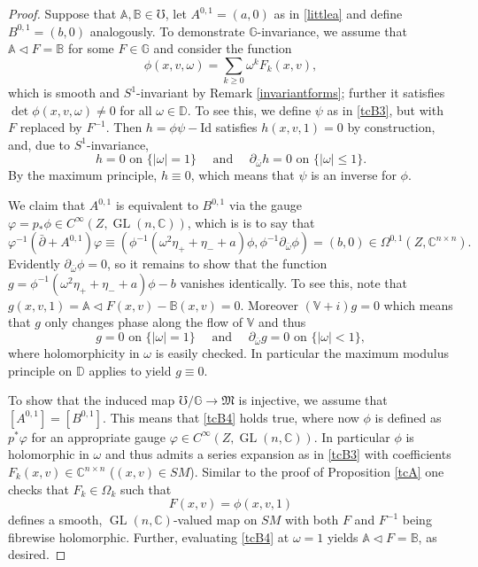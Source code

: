 \documentclass[JEP,XML,SOM,Unicode,published]{cedram}
\DeclareMathOperator{\GL}{GL}
\theoremstyle{plain}
\theoremstyle{definition}
\newcommand{\A}{\mathbb{A}}
\newcommand{\B}{\mathbb{B}}
\newcommand{\G}{\mathbb{G}}
\newcommand{\C}{\mathbb{C}}
\newcommand{\DD}{\mathbb{D}}
\newcommand{\V}{\mathbb{V}}
\newcommand{\M}{\mathfrak{M}}
\newcommand{\Id}{\mathrm{Id}}
\newcommand{\1}{{\bf 1}}
\let\act\triangleleft
\begin{document}
\begin{proof} Suppose that $\A,\B\in \mho$, let $A^{0,1}=(a,0)$ as in \eqref{littlea} and define $B^{0,1}=(b,0)$ analogously. To demonstrate $\G$-invariance, we assume that $\A \act F=\B$ for some $F\in \G$ and consider the function
\begin{equation} \label{tcB3}
\phi(x,v,\omega) = \sum_{k\ge 0} \omega^k F_k(x,v),
\end{equation}
which is smooth and $S^1$-invariant by Remark \ref{invariantforms}; further it satisfies $\det \phi(x,v,\omega) \neq 0$ for all $\omega\in \DD$. To see this, we define $\psi$ as in \eqref{tcB3}, but with $F$ replaced by $F^{-1}$. Then $h=\phi \psi - \Id$ satisfies $h(x,v,1)=0$ by construction, and, due to $S^1$-invariance,
\begin{equation*}
h = 0 \text{ on } \{\vert \omega \vert = 1\} \quad \text{ and } \quad \partial_{\bar \omega} h = 0 \text { on } \{\vert \omega \vert\le 1\}.
\end{equation*}
By the maximum principle, $h\equiv 0$, which means that $\psi$ is an inverse for $\phi$.

We claim that $A^{0,1}$ is equivalent to $B^{0,1}$ via the gauge $\varphi=p_*\phi \in C^\infty(Z,\GL(n,\C))$, which is is to say that
\begin{equation}\label{tcB4}
\varphi^{-1} (\bar \partial + A^{0,1})\varphi \equiv \left(\phi^{-1}(\omega^2 \eta_+ + \eta_- + a)\phi, \phi^{-1}\partial_{\bar \omega}\phi\right)=(b,0)\in \Omega^{0,1}(Z,\C^{n\times n}).
\end{equation}
Evidently $\partial_{\bar \omega} \phi = 0$, so it remains to show that the function $g = \phi^{-1}(\omega^2 \eta_+ + \eta_- + a)\phi - b$ vanishes identically. To see this, note that
$g(x,v,1)=\A\act F(x,v)-\B(x,v)=0$. Moreover $(\V + i)g=0$ which means that $g$ only changes phase along the flow of $\V$ and thus
\begin{equation*}
g = 0 \text{ on } \{\vert \omega \vert = 1\} \quad \text{ and } \quad \partial_{\bar \omega}g = 0 \text{ on } \{\vert \omega \vert < 1\},
\end{equation*}
where holomorphicity in $\omega$ is easily checked. In particular the maximum modulus principle on $\DD$ applies to yield $g\equiv 0$.

To show that the induced map $\mho/\G\to \M$ is injective, we assume that $[A^{0,1}]=[B^{0,1}]$. This means that \eqref{tcB4} holds true, where now $\phi$ is defined as $p^*\varphi$ for an appropriate gauge $\varphi\in C^\infty(Z,\GL(n,\C))$. In particular $\phi$ is holomorphic in $\omega$ and thus admits a series expansion as in \eqref{tcB3} with coefficients $F_k(x,v)\in \C^{n\times n}$ ($(x,v)\in SM$). Similar to the proof of Proposition \ref{tcA} one checks that $F_k\in \Omega_k$ such that
\begin{equation*}
F(x,v) = \phi(x,v,1)
\end{equation*}
defines a smooth, $\GL(n,\C)$-valued map on $SM$ with both $F$ and $F^{-1}$ being fibrewise holomorphic. Further, evaluating \eqref{tcB4} at $\omega=1$ yields $\A\act F=\B$, as desired.


\end{proof}
\end{document}
